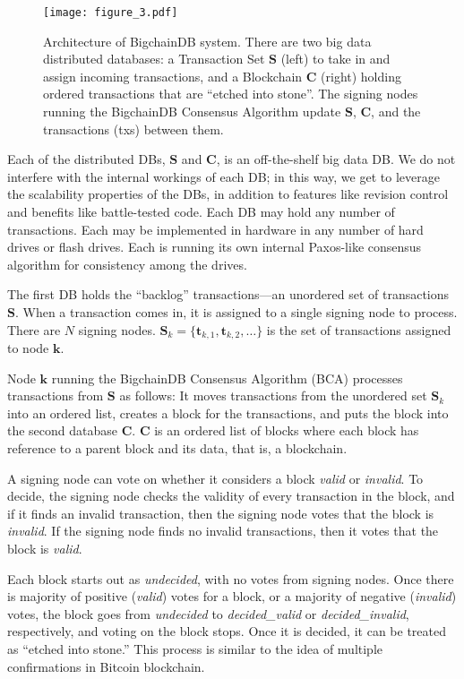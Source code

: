 \begin{figure}[!ht]
  \centering
  \texttt{[image: figure\_3.pdf]}
  \caption{Architecture of BigchainDB system.
  There are two big data distributed databases: a Transaction Set $\mathbf{S}$ (left) to take in and assign incoming transactions, and a Blockchain $\mathbf{C}$ (right) holding ordered transactions that are “etched into stone”.
  The signing nodes running the BigchainDB Consensus Algorithm update $\mathbf{S}$, $\mathbf{C}$, and the transactions (txs) between them.}
  \label{fig:bigchaindb_architecture}
\end{figure}

Each of the distributed DBs, $\mathbf{S}$ and $\mathbf{C}$, is an off-the-shelf big data DB.
We do not interfere with the internal workings of each DB; in this way, we get to leverage the scalability properties of the DBs, in addition to features like revision control and benefits like battle-tested code.
Each DB may hold any number of transactions.
Each may be implemented in hardware in any number of hard drives or flash drives.
Each is running its own internal Paxos-like consensus algorithm for consistency among the drives.

The first DB holds the “backlog” transactions—an unordered set of transactions $\mathbf{S}$.
When a transaction comes in, it is assigned to a single signing node to process.
There are $N$ signing nodes. $\mathbf{S}_k = \{\mathbf{t}_{k,1}, \mathbf{t}_{k,2}, \dots\}$ is the set of transactions assigned to node $\mathbf{k}$.

Node $\mathbf{k}$ running the BigchainDB Consensus Algorithm (BCA) processes transactions from $\mathbf{S}$ as follows: It moves transactions from the unordered set $\mathbf{S}_k$ into an ordered list, creates a block for the transactions, and puts the block into the second database $\mathbf{C}$.
$\mathbf{C}$ is an ordered list of blocks where each block has reference to a parent block and its data, that is, a blockchain.

A signing node can vote on whether it considers a block \textsf{\textit{valid}} or \textsf{\textit{invalid}}. To decide, the signing node checks the validity of every transaction in the block, and if it finds an invalid transaction, then the signing node votes that the block is \textsf{\textit{invalid}}.
If the signing node finds no invalid transactions, then it votes that the block is \textsf{\textit{valid}}.

Each block starts out as \textsf{\textit{undecided}}, with no votes from signing nodes.
Once there is majority of positive (\textsf{\textit{valid}}) votes for a block, or a majority of negative (\textsf{\textit{invalid}}) votes, the block goes from \textsf{\textit{undecided}} to \textsf{\textit{decided\_valid}} or \textsf{\textit{decided\_invalid}}, respectively, and voting on the block stops.
Once it is decided, it can be treated as “etched into stone.” This process is similar to the idea of multiple confirmations in Bitcoin blockchain.

